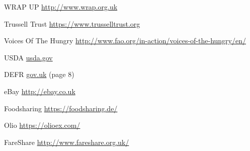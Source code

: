 \documentclass[12pt]{article}
\begin{document}
\begin{thebibliography}{1}

   WRAP UP  \href{http://www.wrap.org.uk/sites/files/wrap/Household_food_waste_in_the_UK_2015_Report.pdf}{http://www.wrap.org.uk}

   Trussell Trust \href{https://www.trusselltrust.org/2015/11/18/uk-foodbank-use-still-at-record-levels-as-hunger-remains-major-concern-for-low-income-families/}{https://www.trusselltrust.org}

   Voices Of The Hungry \href{http://www.fao.org/in-action/voices-of-the-hungry/en/}{http://www.fao.org/in-action/voices-of-the-hungry/en/}
  
   USDA \href{https://www.fsis.usda.gov/wps/portal/fsis/topics/food-safety-education/get-answers/food-safety-fact-sheets/food-labeling/food-product-dating/food-product-dating/!ut/p/a1/jVJdT8IwFP01PJYWhzB8W5YYQBkSooy9mLvtbmvStUtbmPjrLaCJGqa0T_fccz_OaWlCY5pI2PMSLFcSxDFORq9sxUaDScjmy8ngns2il9XyIQyZv751hO0fhMi7sr7jBOy_-vkVA270IlyUNGnAVoTLQtG4REtAmha1oXGhVE4MFGgPpIDMElMh2q-EgBQFl-Vn2GiV7xwndxZ1gRua_FyLDdydRd56OJ1HHlsOfxMu-HYmdBvjlJdCpadH2gYy9XwnUWOBGnV_px1cWdvc9ViPtW3brzHnGYgcuDj0M1X32HfZ-NagtkTjHkEY0lZgjxjXp49w1IXGZUGIA6kRJIG94jk5tfAm4_HQv7RFpYyl8aXptKmf4_fHYMr4U73xTfAB8mN6gw!!/#3}{usda.gov}
  
   DEFR \href{https://www.gov.uk/government/uploads/system/uploads/attachment_data/file/69316/pb132629-food-date-labelling-110915.pdf}{gov.uk} (page 8)
  
   eBay \href{http://ebay.co.uk}{http://ebay.co.uk}

   Foodsharing \href{https://foodsharing.de/}{https://foodsharing.de/}

   Olio \href{https://olioex.com/}{https://olioex.com/}
  
   FareShare \href{http://www.fareshare.org.uk/}{http://www.fareshare.org.uk/}
\end{thebibliography}
\end{document}
